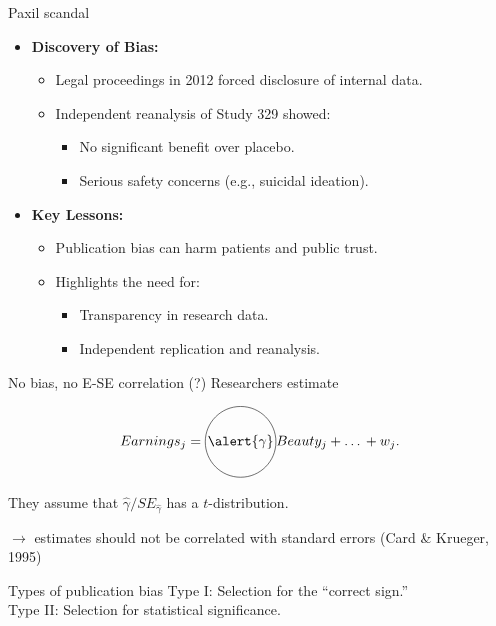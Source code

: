 \documentclass{beamer} %
\begin{document}
\begin{frame}{Paxil scandal}
    \begin{itemize}
        \item \textbf{Discovery of Bias:}
        \begin{itemize}
            \item Legal proceedings in 2012 forced disclosure of internal data.
            \item Independent reanalysis of Study 329 showed:
            \begin{itemize}
                \item No significant benefit over placebo.
                \item Serious safety concerns (e.g., suicidal ideation).
            \end{itemize}
        \end{itemize}
				
				\bigskip
        \item \textbf{Key Lessons:}
        \begin{itemize}
            \item Publication bias can harm patients and public trust.
            \item Highlights the need for:
            \begin{itemize}
                \item Transparency in research data.
                \item Independent replication and reanalysis.
            \end{itemize}
        \end{itemize}
    \end{itemize}
\end{frame}

\begin{frame}{No bias, no E-SE correlation (?)}
Researchers estimate

   \begin{equation*}
    Earnings_j = \tikz[baseline={(E.base)}]{\node[draw,circle,inner sep=1pt] (E) {$\alert{\gamma}$};} Beauty_j + \ldots{} + w_j.
    \end{equation*}
		
\smallskip

They assume that $\widehat{\gamma}/SE_{\widehat{\gamma}}$ has a $t$-distribution. 

\smallskip

$\rightarrow$ \alert{estimates should not be correlated with standard errors} (Card \& Krueger, 1995)

\bigskip

\begin{block}{Types of publication bias}
Type I: Selection for the ``correct sign.'' \\
Type II: Selection for statistical significance.
\end{block}

\end{frame}
\end{document}

